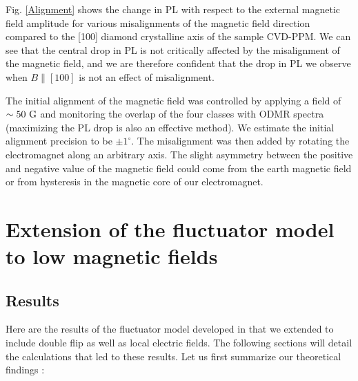 \documentclass[preprintnumbers,amsmath,amssymb,onecolumn,12pt]{revtex4-2}\usepackage{graphicx}%
\begin{document}
Fig. \ref{Alignment} shows the change in PL with respect to the external magnetic field amplitude for various misalignments of the magnetic field direction compared to the [100] diamond crystalline axis of the sample CVD-PPM. We can see that the central drop in PL is not critically affected by the misalignment of the magnetic field, and we are therefore confident that the drop in PL we observe when $B\parallel [100]$ is not an effect of misalignment.

The initial alignment of the magnetic field was controlled by applying a field of $\sim 50\ \rm G$ and monitoring the overlap of the four classes with ODMR spectra (maximizing the PL drop is also an effective method). We estimate the initial alignment precision to be $\pm 1^\circ$. The misalignment was then added by rotating the electromagnet along an arbitrary axis. The slight asymmetry between the positive and negative value of the magnetic field could come from the earth magnetic field or from hysteresis in the magnetic core of our electromagnet.
\section{Extension of the fluctuator model to low magnetic fields}

\subsection{Results}

Here are the results of the fluctuator model developed in \cite{choi_depolarization_2017} that we extended to include double flip as well as local electric fields. The following sections will detail the calculations that led to these results. Let us first summarize our theoretical findings :
\end{document}
